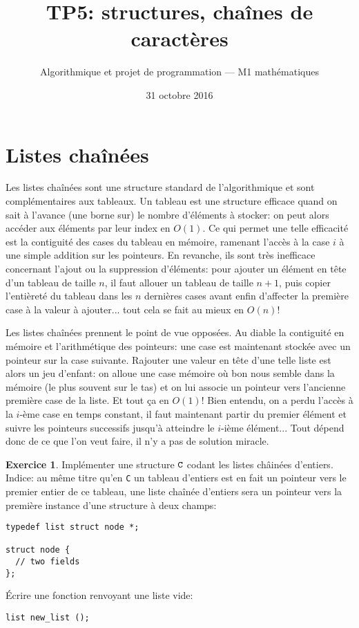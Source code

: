 \documentclass[french,a4paper]{article}
\title{\sffamily TP5: structures, chaînes de caractères}%
\date{31 octobre 2016}%
\author{Algorithmique et projet de programmation --- M1
  mathématiques}%
\theoremstyle{definition}
\newtheorem{exercise}{Exercice}
\theoremstyle{remark}
\begin{document}
\maketitle

\section{Listes chaînées}
\label{sec:linked-list}

Les listes chaînées sont une structure standard de l'algorithmique et
sont complémentaires aux tableaux. Un tableau est une structure
efficace quand on sait à l'avance (une borne sur) le nombre d'éléments
à stocker: on peut alors accéder aux éléments par leur index en
$O(1)$. Ce qui permet une telle efficacité est la contiguité des cases
du tableau en mémoire, ramenant l'accès à la case $i$ à une simple
addition sur les pointeurs. En revanche, ils sont très inefficace
concernant l'ajout ou la suppression d'éléments: pour ajouter un
élément en tête d'un tableau de taille $n$, il faut allouer un tableau
de taille $n+1$, puis copier l'entièreté du tableau dans les $n$
dernières cases avant enfin d'affecter la première case à la valeur à
ajouter... tout cela se fait au mieux en $O(n)$!

Les listes chaînées prennent le point de vue opposées. Au diable la
contiguité en mémoire et l'arithmétique des pointeurs: une case est
maintenant stockée avec un pointeur sur la case suivante. Rajouter une
valeur en tête d'une telle liste est alors un jeu d'enfant: on alloue
une case mémoire où bon nous semble dans la mémoire (le plus souvent
sur le tas) et on lui associe un pointeur vers l'ancienne première
case de la liste. Et tout ça en $O(1)$! Bien entendu, on a perdu
l'accès à la $i$-ème case en temps constant, il faut maintenant partir
du premier élément et suivre les pointeurs successifs jusqu'à
atteindre le $i$-ième élément... Tout dépend donc de ce que l'on veut
faire, il n'y a pas de solution miracle.

\begin{exercise}
  Implémenter une structure $\tt C$ codant les listes châinées
  d'entiers. Indice: au même titre qu'en {\tt C} un tableau d'entiers
  est en fait un pointeur vers le premier entier de ce tableau, une
  liste chaînée d'entiers sera un pointeur vers la première instance
  d'une structure à deux champs:
  \begin{lstlisting}
typedef list struct node *;
    
struct node {
  // two fields      
};
  \end{lstlisting}
 
  \'Ecrire une fonction renvoyant une liste vide:
  \begin{lstlisting}
list new_list ();
  \end{lstlisting}
\end{exercise}
\end{document}
